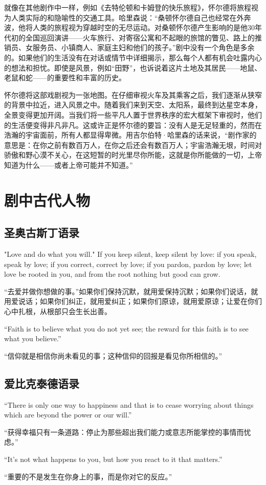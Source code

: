 \documentclass[lang=cn,newtx,10pt,scheme=chinese]{elegantbook}
\begin{document}
就像在其他剧作中一样，例如《去特伦顿和卡姆登的快乐旅程》，怀尔德将旅程视为人类实际的和隐喻性的交通工具。哈里森说：“桑顿怀尔德自己也经常在外奔波，他将人类的旅程视为穿越时空的无尽运动。对桑顿怀尔德产生影响的是他30年代初的全国巡回演讲——火车旅行、对寄宿公寓和不起眼的旅馆的瞥见、路上的推销员、女服务员、小镇商人、家庭主妇和他们的孩子。”剧中没有一个角色是多余的。如果他们的生活没有在对话或情节中详细揭示，那么每个人都有机会吐露内心的想法和担忧。即使是风景，例如“田野”，也诉说着这片土地及其居民——地鼠、老鼠和蛇——的重要性和丰富的历史。

怀尔德将这部戏剧视为一张地图。在仔细审视火车及其乘客之后，我们逐渐从狭窄的背景中拉近，进入风景之中。随着我们来到天空、太阳系，最终到达星空本身，全景变得更加开阔。当我们将一些平凡人置于世界秩序的宏大框架下审视时，他们的生活便变得非凡非凡。这或许正是怀尔德的要旨：没有人是无足轻重的，然而在浩瀚的宇宙面前，所有人都显得卑微。用吉尔伯特·哈里森的话来说，“剧作家的意思是：在你之前有数百万人，在你之后还会有数百万人；宇宙浩瀚无垠，时间对骄傲和野心漠不关心，在这短暂的时光里尽你所能，这就是你所能做的一切，上帝知道为什么——或者上帝可能并不知道。”

\chapter{剧中古代人物}

\section{圣奥古斯丁语录}

"Love and do what you will." If you keep silent, keep silent by love: if you speak, speak by love; if you correct, correct by love; if you pardon, pardon by love; let love be rooted in you, and from the root nothing but good can grow.

“去爱并做你想做的事。”如果你们保持沉默，就用爱保持沉默；如果你们说话，就用爱说话；如果你们纠正，就用爱纠正；如果你们原谅，就用爱原谅；让爱在你们心中扎根，从根部只会生长出善。

“Faith is to believe what you do not yet see; the reward for this faith is to see what you believe.”

“信仰就是相信你尚未看见的事；这种信仰的回报是看见你所相信的。”

\section{爱比克泰德语录}

“There is only one way to happiness and that is to cease worrying about things which are beyond the power or our will.”

“获得幸福只有一条道路：停止为那些超出我们能力或意志所能掌控的事情而忧虑。”

“It's not what happens to you, but how you react to it that matters.”

“重要的不是发生在你身上的事，而是你对它的反应。”
\end{document}
